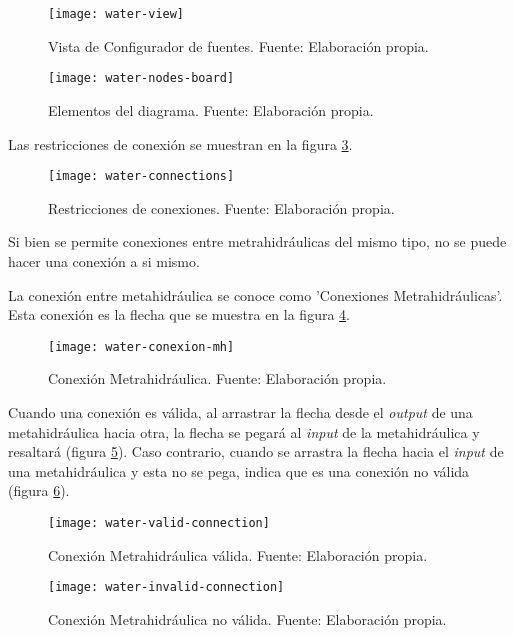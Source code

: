 \begin{figure}[H]
	\centering
	\texttt{[image: water-view]}
	\caption{\label{fig:water-view} Vista de Configurador de fuentes. Fuente: Elaboración propia.}
\end{figure}

\begin{figure}[H]
	\centering
	\texttt{[image: water-nodes-board]}
	\caption{\label{fig:water-nodes-board} Elementos del diagrama. Fuente: Elaboración propia.}
\end{figure}

Las restricciones de conexión se muestran en la figura \ref{fig:water-connections}.

\begin{figure}[H]
	\centering
	\texttt{[image: water-connections]}
	\caption{\label{fig:water-connections} Restricciones de conexiones. Fuente: Elaboración propia.}
\end{figure}

Si bien se permite conexiones entre metrahidráulicas del mismo tipo, no se puede hacer una conexión a si mismo.

La conexión entre metahidráulica se conoce como 'Conexiones Metrahidráulicas'. Esta conexión es la flecha que se muestra en la figura \ref{fig:water-conexion-mh}.

\begin{figure}[H]
	\centering
	\texttt{[image: water-conexion-mh]}
	\caption{\label{fig:water-conexion-mh} Conexión Metrahidráulica. Fuente: Elaboración propia.}
\end{figure}

Cuando una conexión es válida, al arrastrar la flecha desde el \textit{output} de una metahidráulica hacia otra, la flecha se pegará al \textit{input} de la metahidráulica y resaltará (figura \ref{fig:water-valid-connection}). Caso contrario, cuando se arrastra la flecha hacia el \textit{input} de una metahidráulica y esta no se pega, indica que es una conexión no válida (figura \ref{fig:water-invalid-connection}).

\begin{figure}[H]
	\centering
	\texttt{[image: water-valid-connection]}
	\caption{\label{fig:water-valid-connection} Conexión Metrahidráulica válida. Fuente: Elaboración propia.}
\end{figure}

\begin{figure}[H]
	\centering
	\texttt{[image: water-invalid-connection]}
	\caption{\label{fig:water-invalid-connection} Conexión Metrahidráulica no válida. Fuente: Elaboración propia.}
\end{figure}

